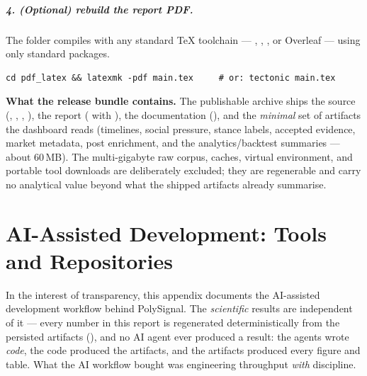 \paragraph{4. (Optional) rebuild the report PDF.}
The  folder compiles with any standard TeX toolchain --- , , , or Overleaf --- using only standard packages.
{\small\begin{verbatim}
cd pdf_latex && latexmk -pdf main.tex     # or: tectonic main.tex
\end{verbatim}}

\noindent\textbf{What the release bundle contains.} The publishable archive ships the
source (, , , ), the report
( with ), the documentation (), and the
\emph{minimal} set of  artifacts the dashboard reads (timelines, social
pressure, stance labels, accepted evidence, market metadata, post enrichment, and the
analytics/backtest summaries --- about 60\,MB). The multi-gigabyte raw corpus, caches,
virtual environment, and portable tool downloads are deliberately excluded; they are
regenerable and carry no analytical value beyond what the shipped artifacts already
summarise.


\chapter{AI-Assisted Development: Tools and Repositories}
\label{ch:aitools}
In the interest of transparency, this appendix documents the AI-assisted development
workflow behind PolySignal. The \emph{scientific} results are independent of it --- every
number in this report is regenerated deterministically from the persisted artifacts
(), and no AI agent ever produced a result: the agents wrote
\emph{code}, the code produced the artifacts, and the artifacts produced every figure and
table. What the AI workflow bought was engineering throughput \emph{with} discipline.

